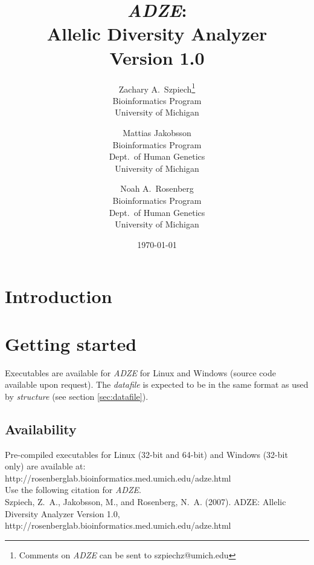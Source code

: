 \documentclass[titlepage,12pt] {article}
\begin{document}


\title{\emph{ADZE}: \\
Allelic Diversity Analyzer\\Version 1.0}
\author{Zachary A.~Szpiech\thanks{Comments on \emph{ADZE} can be sent to
szpiechz@umich.edu} \\
Bioinformatics Program \\
University of Michigan \and Mattias Jakobsson \\
Bioinformatics Program \\ Dept.~of Human Genetics \\ University of
Michigan \and Noah A.~Rosenberg \\ Bioinformatics Program\\ 
Dept.~of Human Genetics \\
University of Michigan }


\date{\today}

\maketitle


\tableofcontents

\newpage
\section{Introduction}



\section{Getting started}
Executables are available for \emph{ADZE} for Linux and Windows (source code 
available upon request).  The \emph{datafile} is expected to be in the same 
format as used by \emph{structure} (see section 
\ref{sec:datafile}).

\subsection{Availability}
\label{sec:avail}
Pre-compiled executables for Linux (32-bit and 64-bit) and Windows (32-bit 
only) are available at:\\
\ttfamily
http://rosenberglab.bioinformatics.med.umich.edu/adze.html
\rmfamily\\
Use the following citation for \emph{ADZE}.\\[.15cm]
Szpiech, Z.~A., Jakobsson, M., and Rosenberg, N.~A. (2007).
ADZE: Allelic Diversity Analyzer Version 1.0,
http://rosenberglab.bioinformatics.med.umich.edu/adze.html
\end{document}
